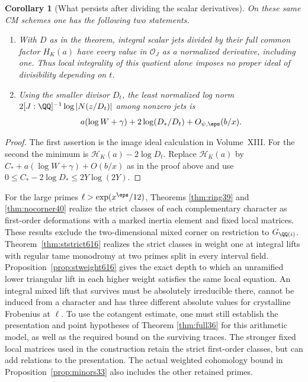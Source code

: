 \documentclass[a4paper,11pt]{article}
\newtheorem{corollary}[proposition]{Corollary}
\theoremstyle{definition}
\theoremstyle{remark}
\newcommand{\lead}[1]{\par\smallskip\noindent{\bfseries\color{ink}#1.}\enspace}
\numberwithin{equation}{section}
\begin{document}
\begin{corollary}[What persists after dividing the scalar derivatives]\label{cor:divide42}
On these same CM schemes one has the following two statements.
\begin{enumerate}\setlength{\itemsep}{1pt}
\item With \(D\) as in the theorem, integral scalar jets divided by their full common factor \(H_K(a)\) have every value in \(\mathcal O_J\) as a normalized derivative, including one. Thus local integrality of this quotient alone imposes no proper ideal of divisibility depending on \(t\).
\item Using the smaller divisor \(D_t\), the least normalized log norm \(2[J:\QQ]^{-1}\log|N(z/D_t)|\) among nonzero jets is
\[
       a(\log W+\gamma)+2\log(D_*/D_t)+O_{\psi,\eps}(b/x).
\]
\end{enumerate}
\end{corollary}
\begin{proof}
The first assertion is the image ideal calculation in Volume~XIII. For the second the minimum is \(\mathcal H_K(a)-2\log D_t\). Replace \(\mathcal H_K(a)\) by \(C_*+a(\log W+\gamma)+O(b/x)\) as in the proof above and use \(0\le C_*-2\log D_*\le2Y\log(2Y)\).
\end{proof}

\lead{The remaining arithmetic inequalities}
For the large primes \(\ell>\exp(x^\eps/12)\), Theorems \ref{thm:ring39} and \ref{thm:nocorner40} realize the strict classes of each complementary character as first-order deformations with a marked inertia element and fixed local matrices. These results exclude the two-dimensional mixed corner on restriction to \(G_{\QQ(i)}\). Theorem~\ref{thm:ststrict616} realizes the strict classes in weight one at integral lifts with regular tame monodromy at two primes split in every interval field. Proposition~\ref{prop:stweight616} gives the exact depth to which an unramified lower triangular lift in each higher weight satisfies the same local equation. An integral mixed lift that survives must be absolutely irreducible there, cannot be induced from a character and has three different absolute values for crystalline Frobenius at \(\ell\). To use the cotangent estimate, one must still establish the presentation and point hypotheses of Theorem \ref{thm:full36} for this arithmetic model, as well as the required bound on the surviving traces. The stronger fixed local matrices used in the construction retain the strict first-order classes, but can add relations to the presentation. The actual weighted cohomology bound in Proposition~\ref{prop:minors33} also includes the other retained primes.
\end{document}
